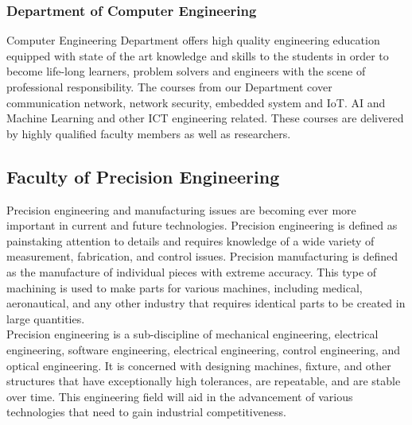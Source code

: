 \documentclass[conference]{IEEEtran}
\begin{document}
\subsubsection{Department of Computer Engineering}
 Computer Engineering Department offers high quality engineering education equipped with state of the art knowledge and skills to the students in order to become life-long learners, problem solvers and engineers with the scene of professional responsibility. The courses from our Department cover communication network, network security, embedded system and IoT. AI and Machine Learning and other ICT engineering related. These courses are delivered by highly qualified faculty members as well as researchers.
\subsection{Faculty of Precision Engineering}
Precision engineering and manufacturing issues are becoming ever more important in current and future technologies. Precision engineering is defined as painstaking attention to details and requires knowledge of a wide variety of measurement, fabrication, and control issues. Precision manufacturing is defined as the manufacture of individual pieces with extreme accuracy. This type of machining is used to make parts for various machines, including medical, aeronautical, and any other industry that requires identical parts to be created in large quantities.\\
Precision engineering is a sub-discipline of mechanical engineering, electrical engineering, software engineering, electrical engineering, control engineering, and optical engineering. It is concerned with designing machines, fixture, and other structures that have exceptionally high tolerances, are repeatable, and are stable over time. This engineering field will aid in the advancement of various technologies that need to gain industrial competitiveness.
\end{document}
